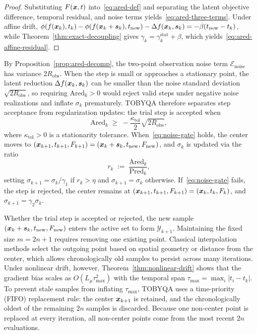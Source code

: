 \begin{proof}
Substituting $F(\boldsymbol{x},t)$ into~\eqref{eq:ared-def} and separating the latent objective difference, temporal residual, and noise terms yields~\eqref{eq:ared-three-terms}. Under affine drift, $\phi(f(\boldsymbol{x}_k), t_k) - \phi(f(\boldsymbol{x}_k+\boldsymbol{s}_k), t_{\mathrm{new}}) - \Delta f(\boldsymbol{x}_k, \boldsymbol{s}_k) = -\beta(t_{\mathrm{new}}-t_k)$, while Theorem~\ref{thm:exact-decoupling} gives $\gamma_k = \gamma_k^{\mathrm{stat}} + \beta$, which yields~\eqref{eq:ared-affine-residual}.
\end{proof}

By Proposition~\ref{prop:ared-decomp}, the two-point observation noise term $\mathcal{E}_{\mathrm{noise}}$ has variance $2 R_{\mathrm{obs}}$. When the step is small or approaches a stationary point, the latent reduction $\Delta f(\boldsymbol{x}_k, \boldsymbol{s}_k)$ can be smaller than the noise standard deviation $\sqrt{2 R_{\mathrm{obs}}}$, so requiring $\mathrm{Ared}_k > 0$ would reject valid steps under negative noise realizations and inflate $\sigma_k$ prematurely. TOBYQA therefore separates step acceptance from regularization updates: the trial step is accepted when
\begin{equation}\label{eq:noise-gate}
  \mathrm{Ared}_k \;\ge\; -\frac{\kappa_{\mathrm{tol}}}{2} \sqrt{2 R_{\mathrm{obs}}},
\end{equation}
where $\kappa_{\mathrm{tol}} > 0$ is a stationarity tolerance. When~\eqref{eq:noise-gate} holds, the center moves to $(\boldsymbol{x}_{k+1}, t_{k+1}, F_{k+1}) = (\boldsymbol{x}_k + \boldsymbol{s}_k, t_{\mathrm{new}}, F_{\mathrm{new}})$, and $\sigma_k$ is updated via the ratio
\begin{equation*}
  r_k \;:=\; \frac{\mathrm{Ared}_k}{\mathrm{Pred}_k},
\end{equation*}
setting $\sigma_{k+1} = \sigma_k / \gamma_1$ if $r_k > \eta$ and $\sigma_{k+1} = \sigma_k$ otherwise. If~\eqref{eq:noise-gate} fails, the step is rejected, the center remains at $(\boldsymbol{x}_{k+1}, t_{k+1}, F_{k+1}) = (\boldsymbol{x}_k, t_k, F_k)$, and $\sigma_{k+1} = \gamma_2 \sigma_k$.

Whether the trial step is accepted or rejected, the new sample $(\boldsymbol{x}_k + \boldsymbol{s}_k, t_{\mathrm{new}}, F_{\mathrm{new}})$ enters the active set to form $\mathcal{Y}_{k+1}$. Maintaining the fixed size $m = 2n+1$ requires removing one existing point. Classical interpolation methods select the outgoing point based on spatial geometry or distance from the center, which allows chronologically old samples to persist across many iterations. Under nonlinear drift, however, Theorem~\ref{thm:nonlinear-drift} shows that the gradient bias scales as $O(L_\mu \tau_{\max}^2)$ with the temporal span $\tau_{\max} = \max_i |t_i - t_k|$. To prevent stale samples from inflating $\tau_{\max}$, TOBYQA uses a time-priority (FIFO) replacement rule: the center $\boldsymbol{x}_{k+1}$ is retained, and the chronologically oldest of the remaining $2n$ samples is discarded. Because one non-center point is replaced at every iteration, all non-center points come from the most recent $2n$ evaluations.

